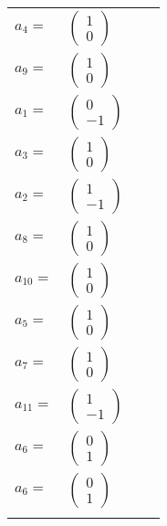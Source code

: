 \documentclass[1p]{elsarticle_modified}
\theoremstyle{definition}
\begin{document}
\begin{tabular}{m{7pt} m{180pt} m{7pt} m{180pt} }
\flushright $a_{4}=$&$\begin{pmatrix}1\\0\end{pmatrix}$ \\
\flushright $a_{9}=$&$\begin{pmatrix}1\\0\end{pmatrix}$ \\
\flushright $a_{1}=$&$\begin{pmatrix}0\\-1\end{pmatrix}$ \\
\flushright $a_{3}=$&$\begin{pmatrix}1\\0\end{pmatrix}$ \\
\flushright $a_{2}=$&$\begin{pmatrix}1\\-1\end{pmatrix}$ \\
\flushright $a_{8}=$&$\begin{pmatrix}1\\0\end{pmatrix}$ \\
\flushright $a_{10}=$&$\begin{pmatrix}1\\0\end{pmatrix}$ \\
\flushright $a_{5}=$&$\begin{pmatrix}1\\0\end{pmatrix}$ \\
\flushright $a_{7}=$&$\begin{pmatrix}1\\0\end{pmatrix}$ \\
\flushright $a_{11}=$&$\begin{pmatrix}1\\-1\end{pmatrix}$ \\
\flushright $a_{6}=$&$\begin{pmatrix}0\\1\end{pmatrix}$\\ \flushright $a_{6}=$&$\begin{pmatrix}0\\1\end{pmatrix}$\\&\end{tabular}
\end{document}
